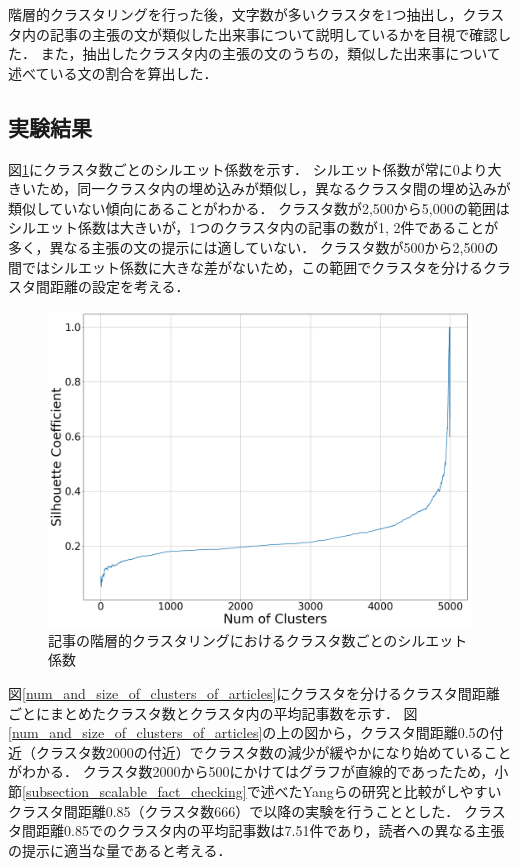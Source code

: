 \documentclass[12pt,a4j]{jreport}
\begin{document}
階層的クラスタリングを行った後，文字数が多いクラスタを1つ抽出し，クラスタ内の記事の主張の文が類似した出来事について説明しているかを目視で確認した．
また，抽出したクラスタ内の主張の文のうちの，類似した出来事について述べている文の割合を算出した．

\subsection{実験結果}
図\ref{articles_silhouette}にクラスタ数ごとのシルエット係数を示す．
シルエット係数が常に0より大きいため，同一クラスタ内の埋め込みが類似し，異なるクラスタ間の埋め込みが類似していない傾向にあることがわかる．
クラスタ数が2,500から5,000の範囲はシルエット係数は大きいが，1つのクラスタ内の記事の数が1, 2件であることが多く，異なる主張の文の提示には適していない．
クラスタ数が500から2,500の間ではシルエット係数に大きな差がないため，この範囲でクラスタを分けるクラスタ間距離の設定を考える．

\begin{figure}[H]
	\centering
	\includegraphics[keepaspectratio, width=120mm]{img/process-06_articles-cluster_num-of-clusters-dependency-on-silhouette-coefficient_with-maximal-silhoette_reduced-data-to-5000_Trim.png}
	\caption{記事の階層的クラスタリングにおけるクラスタ数ごとのシルエット係数}
	\label{articles_silhouette}
\end{figure}

図\ref{num_and_size_of_clusters_of_articles}にクラスタを分けるクラスタ間距離ごとにまとめたクラスタ数とクラスタ内の平均記事数を示す．
図\ref{num_and_size_of_clusters_of_articles}の上の図から，クラスタ間距離0.5の付近（クラスタ数2000の付近）でクラスタ数の減少が緩やかになり始めていることがわかる．
クラスタ数2000から500にかけてはグラフが直線的であったため，小節\ref{subsection_scalable_fact_checking}で述べたYangらの研究と比較がしやすいクラスタ間距離0.85（クラスタ数666）で以降の実験を行うこととした\cite{yang_scalable_2021}．
クラスタ間距離0.85でのクラスタ内の平均記事数は7.51件であり，読者への異なる主張の提示に適当な量であると考える．
\end{document}
